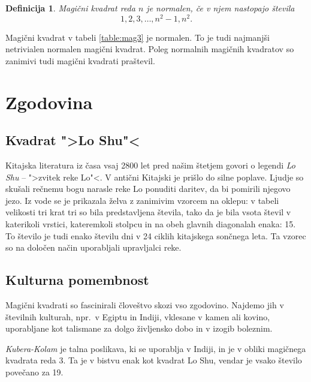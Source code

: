 \documentclass[a4paper,12pt]{article}
\newtheorem{definicija}{Definicija}
\begin{document}
 \begin{definicija}
   Magični kvadrat reda \(n\) je \emph{normalen}, če v njem nastopajo števila
   \begin{equation}
      \label{eq:numbers}
      1, 2, 3, \ldots, n^2-1, n^2.
   \end{equation}
 \end{definicija}

Magični kvadrat v tabeli \ref{table:mag3} je normalen.
To je tudi najmanjši netrivialen normalen magični kvadrat.
Poleg normalnih magičnih kvadratov so zanimivi tudi magični kvadrati praštevil. %


\section{Zgodovina}

\subsection{Kvadrat ">Lo Shu"<}

Kitajska literatura iz časa vsaj 2800 let pred našim štetjem govori o legendi
\emph{Lo Shu} -- ">zvitek reke Lo"<. V antični Kitajski je prišlo do
silne poplave. Ljudje so skušali rečnemu bogu narasle reke Lo ponuditi daritev,
da bi pomirili njegovo jezo. Iz vode se je prikazala želva z zanimivim vzorcem
na oklepu: v tabeli velikosti tri krat tri so bila predstavljena števila, tako
da je bila vsota števil v katerikoli vrstici, kateremkoli stolpcu in na obeh
glavnih diagonalah enaka: 15. To število je tudi enako številu dni v 24 ciklih
kitajskega sončnega leta. Ta vzorec so na določen način uporabljali upravljalci
reke.


\subsection{Kulturna pomembnost}

Magični kvadrati so fascinirali človeštvo skozi vso zgodovino. Najdemo jih
v številnih kulturah, npr.\ v Egiptu in Indiji, vklesane v kamen ali
kovino, uporabljane kot talismane za dolgo življensko dobo in v
izogib boleznim.

\emph{Kubera-Kolam} je talna poslikava, ki se uporablja v Indiji, in je v
obliki magičnega kvadrata reda 3. Ta je v bistvu enak kot kvadrat
Lo Shu, vendar je vsako število povečano za 19.
\end{document}
